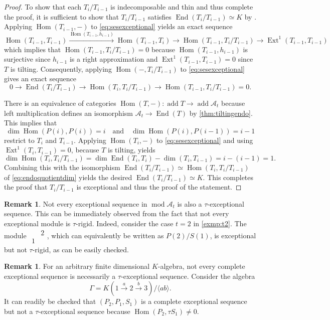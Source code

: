 \documentclass[10pt,twoside, a4paper,reqno]{amsart}
\DeclareMathOperator{\mods}{mod}
\DeclareMathOperator{\Ext}{Ext}
\DeclareMathOperator{\Hom}{Hom}
\DeclareMathOperator{\End}{End}
\DeclareMathOperator{\add}{add}
\newcommand{\A}{\mathscr{A}}
\theoremstyle{definition}
\newtheorem{remark}[theorem]{Remark}
\begin{document}
\begin{proof}
     To show that each $T_i/T_{i-1}$ is indecomposable and thin and thus complete the proof, it is sufficient to show that $T_i/T_{i-1}$ satisfies $\End(T_i/T_{i-1})\simeq K$ by \cite[Cor. 2.4]{HillePloog2019}.
    Applying $\Hom(T_{i-1},-)$ to \cref{eq:sesexceptional} yields an exact sequence
    \[ \Hom(T_{i-1}, T_{i-1}) \xrightarrow{\Hom(T_{i-1}, h_{i-1})} \Hom(T_{i-1}, T_i) \to \Hom(T_{i-1}, T_i/T_{i-1}) \to \Ext^1(T_{i-1}, T_{i-1})\] 
    which implies that $ \Hom(T_{i-1}, T_i/T_{i-1}) = 0$ because $\Hom(T_{i-1}, h_{i-1})$ is surjective since $h_{i-1}$ is a right approximation and $\Ext^1(T_{i-1}, T_{i-1})=0$ since $T$ is tilting. Consequently, applying $\Hom(-, T_i/T_{i-1})$ to \cref{eq:sesexceptional} gives an exact sequence
    \begin{equation}\label{eq:endoquotientdim} 0 \to \End(T_i/T_{i-1}) \to \Hom(T_i, T_i/T_{i-1}) \to \Hom(T_{i-1},T_i/T_{i-1}) = 0.\end{equation}
    
    There is an equivalence of categories $\Hom(T,-): \add T \to \add \A_t$ because left multiplication defines an isomorphism $\A_t \to \End(T)$ by \cref{thm:tiltingendo}. This implies that
    \[ \dim \Hom(P(i),P(i))=i \quad \text{and} \quad \dim \Hom(P(i), P(i-1))=i-1\]
    restrict to $T_i$ and $T_{i-1}$. Applying $\Hom(T_i, -)$ to \cref{eq:sesexceptional} and using $\Ext^1(T_i, T_{i-1})=0$, because $T$ is tilting, yields
    \[ \dim \Hom(T_i, T_i/T_{i-1})= \dim \End(T_i, T_i)- \dim(T_i, T_{i-1})= i-(i-1) = 1.\]
    Combining this with the isomorphism $\End(T_i/T_{i-1}) \simeq \Hom(T_i, T_i/T_{i-1})$ of \cref{eq:endoquotientdim} yields the desired $\End(T_{i}/T_{i-1}) \simeq K$. This completes the proof that $T_i/T_{i-1}$ is exceptional and thus the proof of the statement. 
\end{proof}


\begin{remark}
    Not every exceptional sequence in $\mods \A_t$ is also a $\tau$-exceptional sequence. This can be immediately observed from the fact that not every exceptional module is $\tau$-rigid. Indeed, consider the case $t=2$ in \cref{exmp:t2}. The module $\begin{smallmatrix} & 2\\ 1& \end{smallmatrix}$, which can equivalently be written as $P(2)/S(1)$, is exceptional but not $\tau$-rigid, as can be easily checked. 
\end{remark}

\begin{remark}\label{rmk:excepnottau}
    For an arbitrary finite dimensional $K$-algebra, not every complete exceptional sequence is necessarily a $\tau$-exceptional sequence. Consider the algebra 
    \[ \Gamma = K(1 \xrightarrow{a} 2 \xrightarrow{b}3 ) /\langle ab \rangle.\]
     It can readily be checked that $(P_2, P_1, S_1)$ is a complete exceptional sequence but not a $\tau$-exceptional sequence because $\Hom(P_2, \tau S_1) \neq 0$.
\end{remark}
\end{document}

